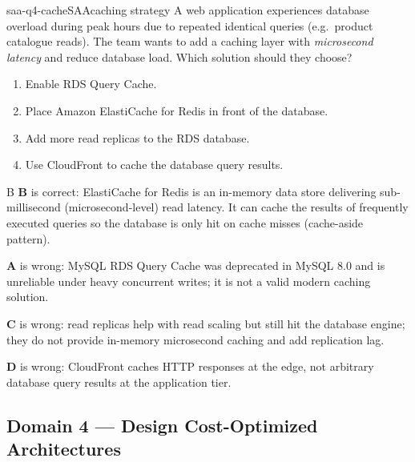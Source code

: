 \begin{question}{saa-q4-cache}{SAA}{caching strategy}
A web application experiences database overload during peak hours due to repeated identical queries (e.g.\ product catalogue reads). The team wants to add a caching layer with \emph{microsecond latency} and reduce database load. Which solution should they choose?

\begin{enumerate}[label=\Alph*.]
  \item Enable RDS Query Cache.
  \item Place Amazon ElastiCache for Redis in front of the database.
  \item Add more read replicas to the RDS database.
  \item Use CloudFront to cache the database query results.
\end{enumerate}
\end{question}

\begin{answer}{B}
\textbf{B} is correct: ElastiCache for Redis is an in-memory data store delivering sub-millisecond (microsecond-level) read latency. It can cache the results of frequently executed queries so the database is only hit on cache misses (cache-aside pattern).

\textbf{A} is wrong: MySQL RDS Query Cache was deprecated in MySQL 8.0 and is unreliable under heavy concurrent writes; it is not a valid modern caching solution.

\textbf{C} is wrong: read replicas help with read scaling but still hit the database engine; they do not provide in-memory microsecond caching and add replication lag.

\textbf{D} is wrong: CloudFront caches HTTP responses at the edge, not arbitrary database query results at the application tier.
\end{answer}


\subsection{Domain 4 --- Design Cost-Optimized Architectures}

